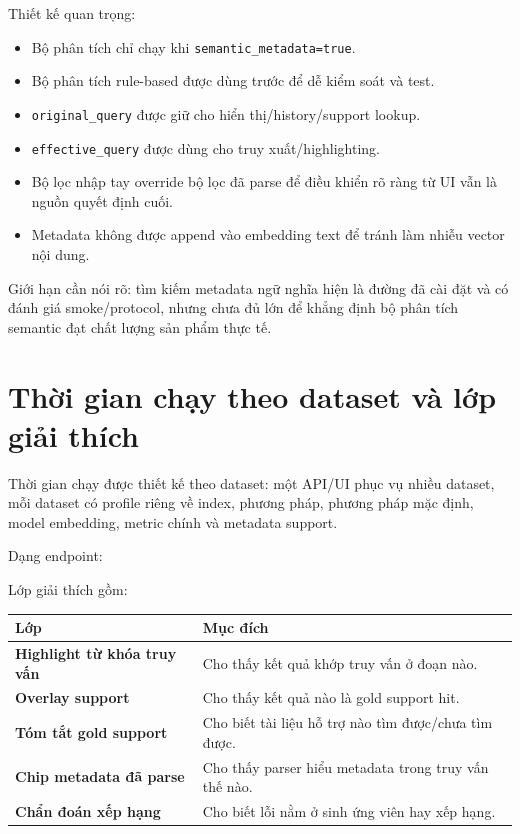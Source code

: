 \documentclass[11pt,a4paper]{article}
\begin{document}
Thiết kế quan trọng:

\begin{itemize}
  \item Bộ phân tích chỉ chạy khi \texttt{semantic\_metadata=true}.
  \item Bộ phân tích rule-based được dùng trước để dễ kiểm soát và test.
  \item \texttt{original\_query} được giữ cho hiển thị/history/support lookup.
  \item \texttt{effective\_query} được dùng cho truy xuất/highlighting.
  \item Bộ lọc nhập tay override bộ lọc đã parse để điều khiển rõ ràng từ UI vẫn là nguồn quyết định cuối.
  \item Metadata không được append vào embedding text để tránh làm nhiễu vector nội dung.
\end{itemize}

Giới hạn cần nói rõ: tìm kiếm metadata ngữ nghĩa hiện là đường đã cài đặt và có đánh giá smoke/protocol,
nhưng chưa đủ lớn để khẳng định bộ phân tích semantic đạt chất lượng sản phẩm thực tế.

\section{Thời gian chạy theo dataset và lớp giải thích}

Thời gian chạy được thiết kế theo dataset: một API/UI phục vụ nhiều dataset, mỗi dataset có profile riêng
về index, phương pháp, phương pháp mặc định, model embedding, metric chính và metadata support.

Dạng endpoint:

\begin{center}
\end{center}

Lớp giải thích gồm:

\begin{tabularx}{\textwidth}{>{\bfseries}p{} Y}
\toprule
Lớp & Mục đích \\
\midrule
Highlight từ khóa truy vấn & Cho thấy kết quả khớp truy vấn ở đoạn nào. \\
Overlay support & Cho thấy kết quả nào là gold support hit. \\
Tóm tắt gold support & Cho biết tài liệu hỗ trợ nào tìm được/chưa tìm được. \\
Chip metadata đã parse & Cho thấy parser hiểu metadata trong truy vấn thế nào. \\
Chẩn đoán xếp hạng & Cho biết lỗi nằm ở sinh ứng viên hay xếp hạng. \\
\bottomrule
\end{tabularx}
\end{document}
